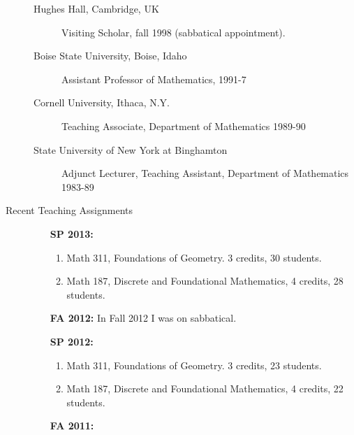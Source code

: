 \begin{description}
\begin{description}
		\item[Hughes Hall, Cambridge, UK]  Visiting Scholar, fall 1998 (sabbatical appointment).
 
                \item[Boise State University, Boise, Idaho] Assistant Professor of
Mathematics, 1991-7
                \item[Cornell University, Ithaca, N.Y.] Teaching Associate, Department
of Mathematics 1989-90
                \item[State University of New York at Binghamton] Adjunct Lecturer,
Teaching Assistant, Department of Mathematics 1983-89
        \end{description}

\newpage

\item[Recent Teaching Assignments]

\begin{enumerate}

\item[]

\item[\bf SP 2013:]

\begin{enumerate}



\item  Math 311, Foundations of Geometry.  3 credits,  30 students.

\item  Math 187, Discrete and Foundational Mathematics, 4 credits, 28 students.

\end{enumerate}

\item[\bf FA 2012:]  In Fall 2012 I was on sabbatical.

\item[\bf SP 2012:]

\begin{enumerate}

\item  Math 311, Foundations of Geometry.  3 credits,  23 students.

\item  Math 187, Discrete and Foundational Mathematics, 4 credits, 22 students.

\end{enumerate}

\item[\bf FA 2011:]

\begin{enumerate}


\end{enumerate}
\end{enumerate}
\end{description}
